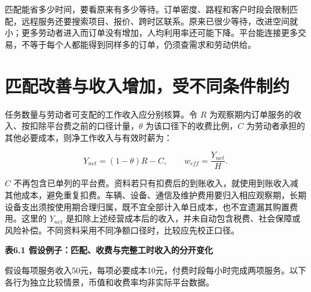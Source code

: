 \documentclass[UTF8,fontset=windows,12pt,a4paper,oneside,openany]{ctexbook}
\begin{document}
匹配能省多少时间，要看原来有多少等待。订单密度、路程和客户时段会限制匹配，远程服务还要搜索项目、报价、跨时区联系。原来已很少等待，改进空间就小；更多劳动者进入而订单没有增加，人均利用率还可能下降。平台能连接更多交易，不等于每个人都能得到同样多的订单，仍须查需求和劳动供给。

\section{匹配改善与收入增加，受不同条件制约}

任务数量与劳动者可支配的工作收入应分别核算。令 $R$ 为观察期内订单服务的收入、按扣除平台费之前的口径计量，$\theta$ 为该口径下的收费比例，$C$ 为劳动者承担的其他必要成本，则净工作收入与有效时薪为：

\[
Y_{net}=(1-\theta)R-C,\qquad
w_{eff}=\frac{Y_{net}}{H}.
\]

$C$ 不再包含已单列的平台费。资料若只有扣费后的到账收入，就使用到账收入减其他成本，避免重复扣费。车辆、设备、通信及维护费用要归入相应观察期，长期设备支出须按使用期合理归属，既不宜全部计入单日成本，也不宜遗漏其购置费用。这里的 $Y_{net}$ 是扣除上述经营成本后的收入，并未自动包含税费、社会保障或风险补偿。不同资料采用不同净额口径时，比较应先校正口径。

\textbf{表6.1 假设例子：匹配、收费与完整工时收入的分开变化}

假设每项服务收入50元，每项必要成本10元，付费时段每小时完成两项服务。以下各行为独立比较情景，币值和收费率均非实际平台数据。
\end{document}
